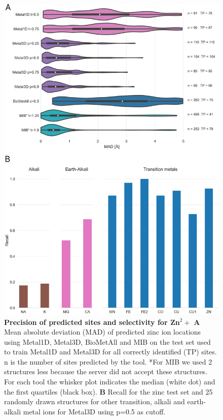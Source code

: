 \documentclass[  ASAPversion,
  ,
  9pt]{elife}
\begin{document}
\begin{figure}
\hypertarget{fig:selectivity-mad}{%
\centering
\includegraphics{images/Figure3_selectivity_mad.png}
\caption{\textbf{Precision of predicted sites and selectivity for Zn$^2+$} \textbf{A} Mean absolute deviation (MAD) of predicted zinc ion locations using Metal1D, Metal3D, BioMetAll and MIB on the test set used to train Metal1D and Metal3D for all correctly identified (TP) sites. n is the number of sites predicted by the tool. *For MIB we used 2 structures less because the server did not accept these structures. For each tool the whisker plot indicates the median (white dot) and the first quartiles (black box). \textbf{B} Recall for the zinc test set and 25 randomly drawn structures for other transition, alkali and earth-alkali metal ions for Metal3D using p=0.5 as cutoff.}\label{fig:selectivity-mad}
}
\end{figure}
\end{document}
